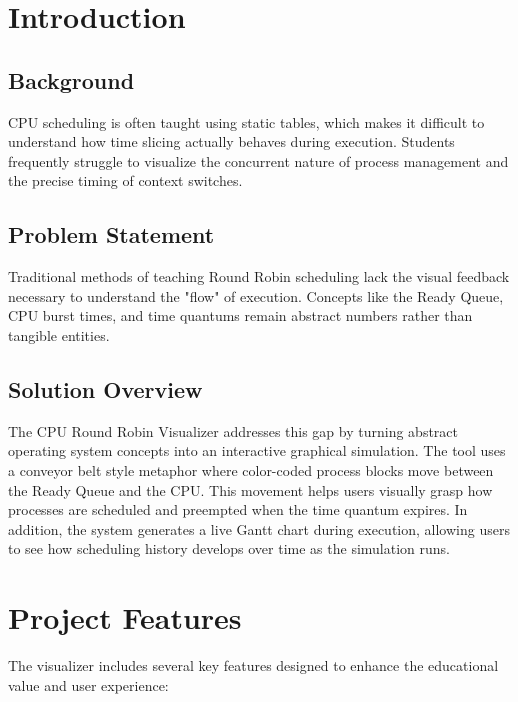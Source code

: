 \documentclass[12pt, a4paper]{report}
\begin{document}
\tableofcontents

\chapter{Introduction}

\section{Background}
CPU scheduling is often taught using static tables, which makes it difficult to understand how time slicing actually behaves during execution. Students frequently struggle to visualize the concurrent nature of process management and the precise timing of context switches.

\section{Problem Statement}
Traditional methods of teaching Round Robin scheduling lack the visual feedback necessary to understand the "flow" of execution. Concepts like the Ready Queue, CPU burst times, and time quantums remain abstract numbers rather than tangible entities.

\section{Solution Overview}
The CPU Round Robin Visualizer addresses this gap by turning abstract operating system concepts into an interactive graphical simulation. The tool uses a conveyor belt style metaphor where color-coded process blocks move between the Ready Queue and the CPU. This movement helps users visually grasp how processes are scheduled and preempted when the time quantum expires. In addition, the system generates a live Gantt chart during execution, allowing users to see how scheduling history develops over time as the simulation runs.

\chapter{Project Features}

The visualizer includes several key features designed to enhance the educational value and user experience:
\end{document}
